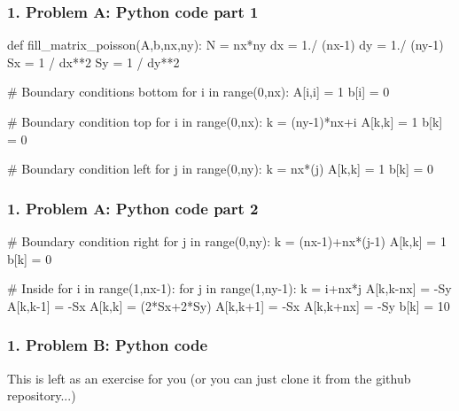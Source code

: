 \begin{frame}[fragile]
	\frametitle{\textbf{1. Problem A: Python code part 1}}


\begin{PYTHON}
def fill_matrix_poisson(A,b,nx,ny):
  N = nx*ny
  dx = 1./ (nx-1)
  dy = 1./ (ny-1)
  Sx = 1 / dx**2
  Sy = 1 / dy**2
  
  # Boundary conditions bottom
  for i in range(0,nx):
    A[i,i] = 1
    b[i] = 0
  
  # Boundary condition top
  for i in range(0,nx):
    k = (ny-1)*nx+i
    A[k,k] = 1
    b[k] = 0
  
  # Boundary condition left
  for j in range(0,ny):
    k = nx*(j)
    A[k,k] = 1
    b[k] = 0

\end{PYTHON}

\end{frame}

\begin{frame}[fragile]
	\frametitle{\textbf{1. Problem A: Python code part 2}}
	
	
	\begin{PYTHON}

# Boundary condition right
for j in range(0,ny):
  k = (nx-1)+nx*(j-1)
  A[k,k] = 1
  b[k] = 0      

# Inside
for i in range(1,nx-1):
  for j in range(1,ny-1):
    k = i+nx*j
    A[k,k-nx] = -Sy
    A[k,k-1] = -Sx
    A[k,k] = (2*Sx+2*Sy)
    A[k,k+1] = -Sx
    A[k,k+nx] = -Sy
    b[k] = 10
\end{PYTHON}
\end{frame}

\begin{frame}[fragile]
	\frametitle{\textbf{1. Problem B: Python code}}
	
	
This is left as an exercise for you (or you can just clone it from the github repository...)
	
\end{frame}


